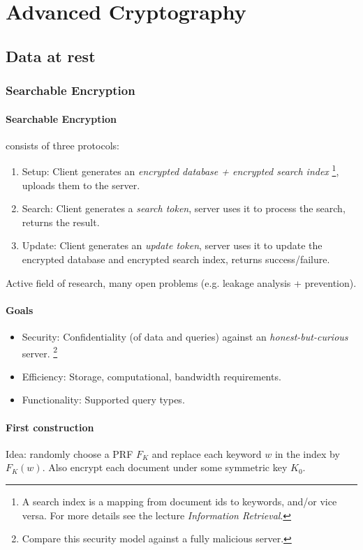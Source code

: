 
\section{Advanced Cryptography}

\subsection{Data at rest}

\subsubsection{Searchable Encryption}

\paragraph{Searchable Encryption}
consists of three protocols:
\begin{enumerate}
\item Setup:
Client generates an \emph{encrypted database + encrypted search index}%
\footnote{A search index is a mapping from document ids to keywords, and/or vice versa.
For more details see the lecture \textit{Information Retrieval}.},
uploads them to the server.
\item Search:
Client generates a \emph{search token}, server uses it to process the search, returns the result.
\item Update:
Client generates an \emph{update token}, server uses it to update the encrypted database and encrypted search index, returns success/failure.
\end{enumerate}
%
Active field of research, many open problems (e.g. leakage analysis + prevention).

\paragraph{Goals}
\begin{itemize}
\item Security:
Confidentiality (of data and queries) against an \emph{honest-but-curious} server.%
\footnote{Compare this security model against a fully malicious server.}
\item Efficiency:
Storage, computational, bandwidth requirements.
\item Functionality:
Supported query types.
\end{itemize}

\paragraph{First construction}
Idea: randomly choose a PRF $F_K$ and replace each keyword $w$ in the index by $F_K(w)$.
Also encrypt each document under some symmetric key $K_0$.

